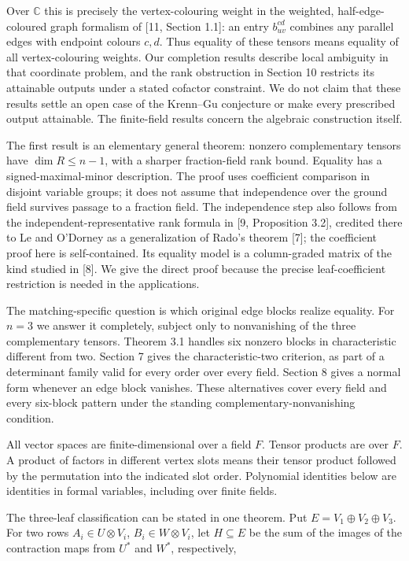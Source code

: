 \documentclass[11pt]{article}
\begin{document}
Over $\mathbb C$ this is precisely the vertex-colouring weight in the weighted, half-edge-coloured graph formalism of [11, Section 1.1]: an entry $b_{uv}^{cd}$ combines any parallel edges with endpoint colours $c,d$. Thus equality of these tensors means equality of all vertex-colouring weights. Our completion results describe local ambiguity in that coordinate problem, and the rank obstruction in Section 10 restricts its attainable outputs under a stated cofactor constraint. We do not claim that these results settle an open case of the Krenn--Gu conjecture or make every prescribed output attainable. The finite-field results concern the algebraic construction itself.


The first result is an elementary general theorem: nonzero complementary tensors have $\dim R\leq n-1$, with a sharper fraction-field rank bound. Equality has a signed-maximal-minor description. The proof uses coefficient comparison in disjoint variable groups; it does not assume that independence over the ground field survives passage to a fraction field. The independence step also follows from the independent-representative rank formula in [9, Proposition 3.2], credited there to Le and O'Dorney as a generalization of Rado's theorem [7]; the coefficient proof here is self-contained. Its equality model is a column-graded matrix of the kind studied in [8]. We give the direct proof because the precise leaf-coefficient restriction is needed in the applications.


The matching-specific question is which original edge blocks realize equality. For $n=3$ we answer it completely, subject only to nonvanishing of the three complementary tensors. Theorem 3.1 handles six nonzero blocks in characteristic different from two. Section 7 gives the characteristic-two criterion, as part of a determinant family valid for every order over every field. Section 8 gives a normal form whenever an edge block vanishes. These alternatives cover every field and every six-block pattern under the standing complementary-nonvanishing condition.


All vector spaces are finite-dimensional over a field $F$. Tensor products are over $F$. A product of factors in different vertex slots means their tensor product followed by the permutation into the indicated slot order. Polynomial identities below are identities in formal variables, including over finite fields.


The three-leaf classification can be stated in one theorem. Put $E=V_1\oplus V_2\oplus V_3$. For two rows $A_i\in U\otimes V_i$, $B_i\in W\otimes V_i$, let $H\subseteq E$ be the sum of the images of the contraction maps from $U^*$ and $W^*$, respectively,
\end{document}
